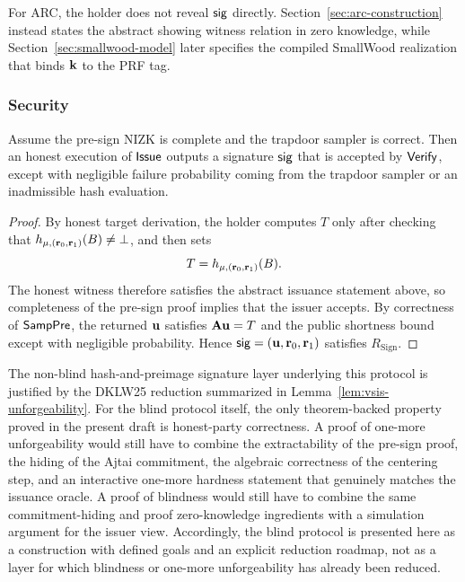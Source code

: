 For ARC, the holder does not reveal \(\mathsf{sig}\) directly. Section~\ref{sec:arc-construction} instead states the abstract
showing witness relation in zero knowledge, while Section~\ref{sec:smallwood-model} later specifies the compiled
SmallWood realization that binds \(\mathbf{k}\) to the PRF tag.

\subsubsection{Security}
\begin{proposition}[Correctness]
Assume the pre-sign NIZK is complete and the trapdoor sampler is correct. Then an honest execution of \(\mathsf{Issue}\)
outputs a signature \(\mathsf{sig}\) that is accepted by \(\mathsf{Verify}\), except with negligible failure probability coming from the
trapdoor sampler or an inadmissible hash evaluation.
\end{proposition}

\begin{proof}
By honest target derivation, the holder computes \(T\) only after checking that
\(h_{\mathbf{\mu},(\mathbf{r}_0,\mathbf{r}_1)}(B)\neq\bot\), and then sets
\[
T=h_{\mathbf{\mu},(\mathbf{r}_0,\mathbf{r}_1)}(B).
\]
The honest witness therefore satisfies the abstract issuance statement above, so completeness of the pre-sign proof
implies that the issuer accepts. By correctness of \(\mathsf{SampPre}\), the returned \(\mathbf{u}\) satisfies \(\mathbf{A}\mathbf{u}=T\) and
the public shortness bound except with negligible probability. Hence \(\mathsf{sig}=(\mathbf{u},\mathbf{r}_0,\mathbf{r}_1)\) satisfies
\(R_{\mathrm{Sign}}\).
\end{proof}


\begin{remark}\label{rem:blind-security-roadmap}
The non-blind hash-and-preimage signature layer underlying this protocol is justified by the DKLW25 reduction summarized
in Lemma~\ref{lem:vsis-unforgeability}. For the blind protocol itself, the only theorem-backed property proved in the
present draft is honest-party correctness. A proof of one-more unforgeability would still have to combine the
extractability of the pre-sign proof, the hiding of the Ajtai commitment, the algebraic correctness of the centering
step, and an interactive one-more hardness statement that genuinely matches the issuance oracle. A proof of blindness
would still have to combine the same commitment-hiding and proof zero-knowledge ingredients with a simulation argument
for the issuer view. Accordingly, the blind protocol is presented here as a construction with defined goals and an
explicit reduction roadmap, not as a layer for which blindness or one-more unforgeability has already been reduced.
\end{remark}

